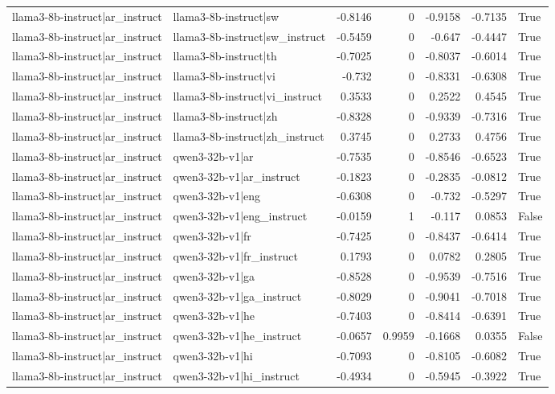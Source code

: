\begin{table}
\begin{tabular}{l l r r r r l}
llama3-8b-instruct|ar_instruct & llama3-8b-instruct|sw & -0.8146 & 0 & -0.9158 & -0.7135 & True \\
llama3-8b-instruct|ar_instruct & llama3-8b-instruct|sw_instruct & -0.5459 & 0 & -0.647 & -0.4447 & True \\
llama3-8b-instruct|ar_instruct & llama3-8b-instruct|th & -0.7025 & 0 & -0.8037 & -0.6014 & True \\
llama3-8b-instruct|ar_instruct & llama3-8b-instruct|vi & -0.732 & 0 & -0.8331 & -0.6308 & True \\
llama3-8b-instruct|ar_instruct & llama3-8b-instruct|vi_instruct & 0.3533 & 0 & 0.2522 & 0.4545 & True \\
llama3-8b-instruct|ar_instruct & llama3-8b-instruct|zh & -0.8328 & 0 & -0.9339 & -0.7316 & True \\
llama3-8b-instruct|ar_instruct & llama3-8b-instruct|zh_instruct & 0.3745 & 0 & 0.2733 & 0.4756 & True \\
llama3-8b-instruct|ar_instruct & qwen3-32b-v1|ar & -0.7535 & 0 & -0.8546 & -0.6523 & True \\
llama3-8b-instruct|ar_instruct & qwen3-32b-v1|ar_instruct & -0.1823 & 0 & -0.2835 & -0.0812 & True \\
llama3-8b-instruct|ar_instruct & qwen3-32b-v1|eng & -0.6308 & 0 & -0.732 & -0.5297 & True \\
llama3-8b-instruct|ar_instruct & qwen3-32b-v1|eng_instruct & -0.0159 & 1 & -0.117 & 0.0853 & False \\
llama3-8b-instruct|ar_instruct & qwen3-32b-v1|fr & -0.7425 & 0 & -0.8437 & -0.6414 & True \\
llama3-8b-instruct|ar_instruct & qwen3-32b-v1|fr_instruct & 0.1793 & 0 & 0.0782 & 0.2805 & True \\
llama3-8b-instruct|ar_instruct & qwen3-32b-v1|ga & -0.8528 & 0 & -0.9539 & -0.7516 & True \\
llama3-8b-instruct|ar_instruct & qwen3-32b-v1|ga_instruct & -0.8029 & 0 & -0.9041 & -0.7018 & True \\
llama3-8b-instruct|ar_instruct & qwen3-32b-v1|he & -0.7403 & 0 & -0.8414 & -0.6391 & True \\
llama3-8b-instruct|ar_instruct & qwen3-32b-v1|he_instruct & -0.0657 & 0.9959 & -0.1668 & 0.0355 & False \\
llama3-8b-instruct|ar_instruct & qwen3-32b-v1|hi & -0.7093 & 0 & -0.8105 & -0.6082 & True \\
llama3-8b-instruct|ar_instruct & qwen3-32b-v1|hi_instruct & -0.4934 & 0 & -0.5945 & -0.3922 & True \\

\end{tabular}
\end{table}
